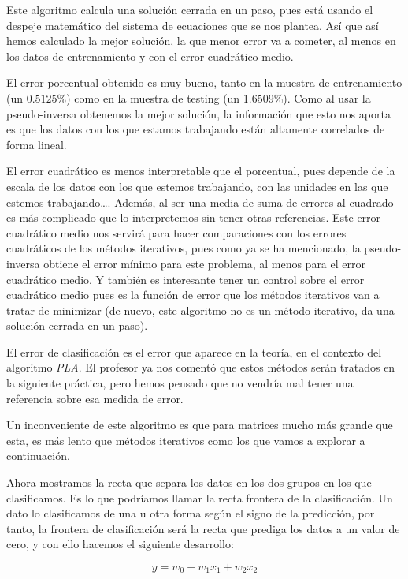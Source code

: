 \documentclass[11pt]{article}
\begin{document}
Este algoritmo calcula una solución cerrada en un paso, pues está usando el despeje matemático del sistema de ecuaciones que se nos plantea. Así que así hemos calculado la mejor solución, la que menor error va a cometer, al menos en los datos de entrenamiento y con el error cuadrático medio.

El error porcentual obtenido es muy bueno, tanto en la muestra de entrenamiento (un $0.5125\%$) como en la muestra de testing (un 1.6509\%). Como al usar la pseudo-inversa obtenemos la mejor solución, la información que esto nos aporta es que los datos con los que estamos trabajando están altamente correlados de forma lineal.

El error cuadrático es menos interpretable que el porcentual, pues depende de la escala de los datos con los que estemos trabajando, con las unidades en las que estemos trabajando\ldots. Además, al ser una media de suma de errores al cuadrado es más complicado que lo interpretemos sin tener otras referencias. Este error cuadrático medio nos servirá para hacer comparaciones con los errores cuadráticos de los métodos iterativos, pues como ya se ha mencionado, la pseudo-inversa obtiene el error mínimo para este problema, al menos para el error cuadrático medio. Y también es interesante tener un control sobre el error cuadrático medio pues es la función de error que los métodos iterativos van a tratar de minimizar (de nuevo, este algoritmo no es un método iterativo, da una solución cerrada en un paso).

El error de clasificación es el error que aparece en la teoría, en el contexto del algoritmo \emph{PLA}. El profesor ya nos comentó que estos métodos serán tratados en la siguiente práctica, pero hemos pensado que no vendría mal tener una referencia sobre esa medida de error.

Un inconveniente de este algoritmo es que para matrices mucho más grande que esta, es más lento que métodos iterativos como los que vamos a explorar a continuación.

Ahora mostramos la recta que separa los datos en los dos grupos en los que clasificamos. Es lo que podríamos llamar la recta frontera de la clasificación. Un dato lo clasificamos de una u otra forma según el signo de la predicción, por tanto, la frontera de clasificación será la recta que prediga los datos a un valor de cero, y con ello hacemos el siguiente desarrollo:

\begin{displaymath}
y = w_0 + w_1 x_1 + w_2 x_2
\end{displaymath}
\end{document}
